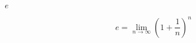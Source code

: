 \documentclass[10pt]{book}
\begin{document}
\begin{mdSnippets}
\begin{mdInlineSnippet}[e1671797c52e15f763380b45e841ec32]%
$e$\end{mdInlineSnippet}%
\begin{mdDisplaySnippet}[3237b2e9a664b881e4e2d1c3fd75b063]%
\[%
e = \lim_{n\to\infty} \left( 1 + \frac{1}{n} \right)^n
\]%
\end{mdDisplaySnippet}%

\end{mdSnippets}
\end{document}
